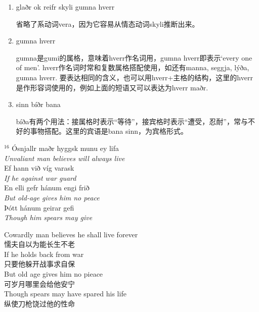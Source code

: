 \begin{grammar*}{}
    \begin{enumerate}[leftmargin=*]
        \item glaðr ok reifr skyli gumna hverr

              省略了系动词vera，因为它容易从情态动词skyli推断出来。

        \item gumna hverr

              gumna是gumi的属格，意味着hverr作名词用，gumna hverr即表示`every one of men'. hverr作名词时常和复数属格搭配使用，如还有manna, seggja, lýða, gumna hverr. 要表达相同的含义，也可以用hverr+主格的结构，这里的hverr是作形容词使用的，例如上面的短语又可以表达为hverr maðr.

        \item sinn bíðr bana

              bíða有两个用法：接属格时表示“等待”，接宾格时表示“遭受，忍耐”，常与不好的事物搭配。这里的宾语是bana sinn，为宾格形式。

    \end{enumerate}
\end{grammar*}
\medskip %
\begin{paracol}{2}
    \noindent
    $^{16}$ Ósnjallr maðr hyggsk munu ey lifa\\
    \textit{Unvaliant man believes will always live}\\
    Ef hann við víg varask\\
    \textit{If he against war guard}\\
    En elli gefr hánum engi frið\\
    \textit{But old-age gives him no peace}\\
    \MakeUppercase þótt hánum geirar gefi\\
    \textit{Though him spears may give}\\
    \switchcolumn

    \noindent
    Cowardly man believes he shall live forever\\
    懦夫自以为能长生不老\\
    If he holds back from war\\
    只要他躲开战事求自保\\
    But old age gives him no pieace\\
    可岁月哪里会给他安宁\\
    Though spears may have spared his life\\
    纵使刀枪饶过他的性命\\

\end{paracol}

